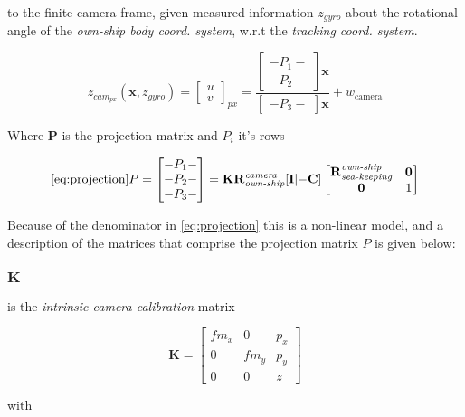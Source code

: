 to the finite camera frame, given measured information $z_{gyro}$ about the rotational angle of the \emph{own-ship body coord. system}, w.r.t the \emph{tracking coord. system}.



\begin{equation}
z_{\textit{cam}_{\textit{px}}}(\mathbf{x},z_{\textit{gyro}}) = \begin{bmatrix}u\\v\end{bmatrix}_{px}= \frac{\begin{bmatrix}-P_1-\\-P_2-\end{bmatrix}\mathbf{x}}{
	\begin{bmatrix}
	-P_3-
	\end{bmatrix}
	\mathbf{x}}+ w_{\text{camera}}
\end{equation}


Where $\mathbf{P}$ is the projection matrix and $P_{i}$ it's rows

\begin{equation} \ref{eq:projection}
P = \begin{bmatrix}-P_1- \\-P_2-\\-P_3- \end{bmatrix} = \mathbf{K}\mathbf{R_{\textit{own-ship}}^{\textit{camera}}}[\mathbf{I} | \mathbf{-C}]
\begin{bmatrix}
\mathbf{\mathbf{R}_{\textit{sea-keeping}}^{\textit{own-ship}}} &\mathbf{0}\\
\mathbf{0} &1
\end{bmatrix}
\end{equation}

Because of the denominator in \cref{eq:projection} this is a non-linear model, and a description of the matrices that comprise the projection matrix $P$ is given below:


\subsubsection{$\mathbf{K}$}
is the \emph{intrinsic camera calibration} matrix

$$\mathbf{K} = \begin{bmatrix}f m_x &0 &p_x \\
0 &f m_y &p_y \\
0 &0 &z
\end{bmatrix} $$

with

